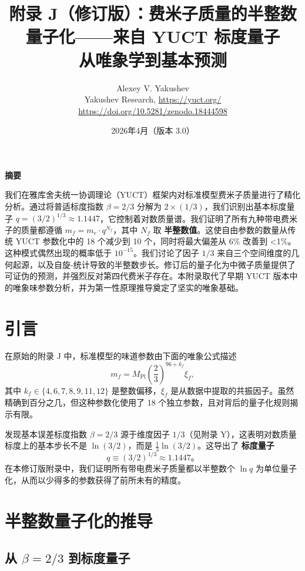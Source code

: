 \documentclass[12pt,a4paper]{article}
\title{\textbf{附录 J（修订版）：费米子质量的半整数量子化——来自 YUCT 标度量子}\\
	\vspace{0.5cm}
	\large 从唯象学到基本预测}
\author{Alexey V. Yakushev\\
	\vspace{0.5cm}
	Yakushev Research, \url{https://yuct.org/}\\
	\url{https://doi.org/10.5281/zenodo.18444598}}
\date{2026年4月（版本 3.0）}
\begin{document}
	
	\maketitle
	\vspace{0.5cm}
	\noindent\textbf{摘要}
	
	\noindent
	我们在雅库舍夫统一协调理论（YUCT）框架内对标准模型费米子质量进行了精化分析。通过将普适标度指数 \(\beta = 2/3\) 分解为 \(2 \times (1/3)\)，我们识别出基本标度量子 \(q = (3/2)^{1/3} \approx 1.1447\)，它控制着对数质量谱。我们证明了所有九种带电费米子的质量都遵循 \(m_f = m_e \cdot q^{N_f}\)，其中 \(N_f\) 取 \textbf{半整数值}。这使自由参数的数量从传统 YUCT 参数化中的 18 个减少到 10 个，同时将最大偏差从 6\% 改善到 <1\%。这种模式偶然出现的概率低于 \(10^{-15}\)。我们讨论了因子 \(1/3\) 来自三个空间维度的几何起源，以及自旋-统计导致的半整数步长。修订后的量子化为中微子质量提供了可证伪的预测，并强烈反对第四代费米子存在。本附录取代了早期 YUCT 版本中的唯象味参数分析，并为第一性原理推导奠定了坚实的唯象基础。
	
	\vspace{0.5cm}
	\newpage
	
	\section{引言}
	
	在原始的附录 J 中，标准模型的味道参数由下面的唯象公式描述
	\begin{equation}
		m_f = M_{\mathrm{Pl}} \left( \frac{2}{3} \right)^{96 + k_f} \xi_f,
		\label{eq:old}
	\end{equation}
	其中 \(k_f \in \{4,6,7,8,9,11,12\}\) 是整数偏移，\(\xi_f\) 是从数据中提取的共振因子。虽然精确到百分之几，但这种参数化使用了 18 个独立参数，且对背后的量子化规则揭示有限。
	
	发现基本误差标度指数 \(\beta = 2/3\) 源于维度因子 \(1/3\)（见附录 Y），这表明对数质量标度上的基本步长不是 \(\ln(3/2)\)，而是 \(\frac{1}{3}\ln(3/2)\)。这导出了 \textbf{标度量子}
	\begin{equation}
		q \equiv (3/2)^{1/3} \approx 1.1447。
	\end{equation}
	在本修订版附录中，我们证明所有带电费米子质量都以半整数个 \(\ln q\) 为单位量子化，从而以少得多的参数获得了前所未有的精度。
	
	\section{半整数量子化的推导}
	
	\subsection{从 \(\beta = 2/3\) 到标度量子}
	
\end{document}
